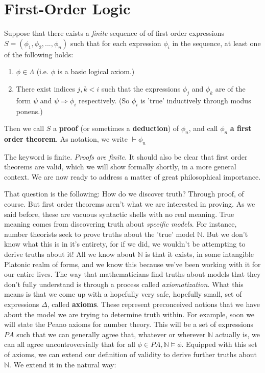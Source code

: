 \section{First-Order Logic}
\begin{definition}
    Suppose that there exists a \textit{finite} sequence of of first order expressions $S = (\phi_1,\phi_2,...,\phi_n)$ such that for each expression $\phi_i$ in the sequence, at least one of the following holds:
    \begin{enumerate}
        \item $\phi \in \Lambda$ (i.e. $\phi$ is a basic logical axiom.)
        \item There exist indices $j,k<i$ such that the expressions $\phi_j$ and $\phi_k$ are of the form $\psi$ and $\psi \Rightarrow \phi_i$ respectively. (So $\phi_i$ is 'true' inductively through modus ponens.)
    \end{enumerate}
    Then we call $S$ a \textbf{proof} (or sometimes a \textbf{deduction}) of $\phi_n$, and call $\phi_n$ \textbf{a first order theorem}. As notation, we write $\vdash \phi_n$
\end{definition}
The keyword is finite. \textit{Proofs are finite.} It should also be clear that first order theorems are valid, which we will show formally shortly, in a more general context. We are now ready to address a matter of great philosophical importance.
\par That question is the following: How do we discover truth? Through proof, of course. But first order theorems aren't what we are interested in proving. As we said before, these are vacuous syntactic shells with no real meaning. True meaning comes from discovering truth about \textit{specific models}. For instance, number theorists seek to prove truths about the 'true' model $\mathbb{N}$. But we don't know what this is in it's entirety, for if we did, we wouldn't be attempting to derive truths about it! All we know about $\mathbb{N}$ is that it exists, in some intangible Platonic realm of forms, and we know this because we've been working with it for our entire lives. The way that mathematicians find truths about models that they don't fully understand is through a process called \textit{axiomatization}. What this means is that we come up with a hopefully very safe, hopefully small, set of expressions $\Delta$, called \textbf{axioms}. These represent preconceived notions that we have about the model we are trying to determine truth within. For example, soon we will state the Peano axioms for number theory. This will be a set of expressions $PA$ such that we can generally agree that, whatever or wherever $\mathbb{N}$ actually is, we can all agree uncontroversially that for all $\phi \in PA, \mathbb{N} \models \phi$. Equipped with this set of axioms, we can extend our definition of validity to derive further truths about $\mathbb{N}$. We extend it in the natural way: 
